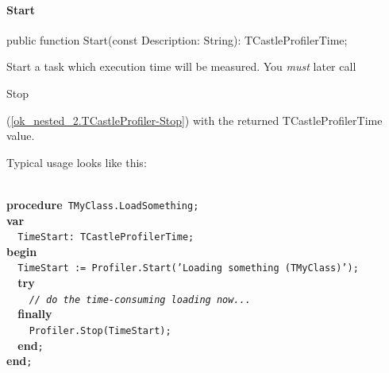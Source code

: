 \documentclass{report}
\begin{document}
\paragraph*{Start}\hspace*{\fill}

\begin{list}{}{
\setlength{\itemindent}{0cm}
\setlength{\listparindent}{0cm}
\setlength{\leftmargin}{\evensidemargin}
\addtolength{\leftmargin}{\tmplength}
\settowidth{\labelsep}{X}
\addtolength{\leftmargin}{\labelsep}
\setlength{\labelwidth}{\tmplength}
}
\begin{flushleft}
\item[\textbf{Declaration}\hfill]
\begin{ttfamily}
public function Start(const Description: String): TCastleProfilerTime;\end{ttfamily}


\end{flushleft}
\par
\item[\textbf{Description}]
Start a task which execution time will be measured. You \textit{must} later call \begin{ttfamily}Stop\end{ttfamily}(\ref{ok_nested_2.TCastleProfiler-Stop}) with the returned TCastleProfilerTime value.

Typical usage looks like this:

\texttt{\\\nopagebreak[3]
}\textbf{procedure}\texttt{~TMyClass.LoadSomething;\\\nopagebreak[3]
}\textbf{var}\texttt{\\\nopagebreak[3]
~~TimeStart:~TCastleProfilerTime;\\\nopagebreak[3]
}\textbf{begin}\texttt{\\\nopagebreak[3]
~~TimeStart~:=~Profiler.Start('Loading~something~(TMyClass)');\\\nopagebreak[3]
~~}\textbf{try}\texttt{\\\nopagebreak[3]
~~~~\textit{//~do~the~time-consuming~loading~now...}\\\nopagebreak[3]
~~}\textbf{finally}\texttt{\\\nopagebreak[3]
~~~~Profiler.Stop(TimeStart);\\\nopagebreak[3]
~~}\textbf{end}\texttt{;\\\nopagebreak[3]
}\textbf{end}\texttt{;\\
}


\end{list}
\end{document}
